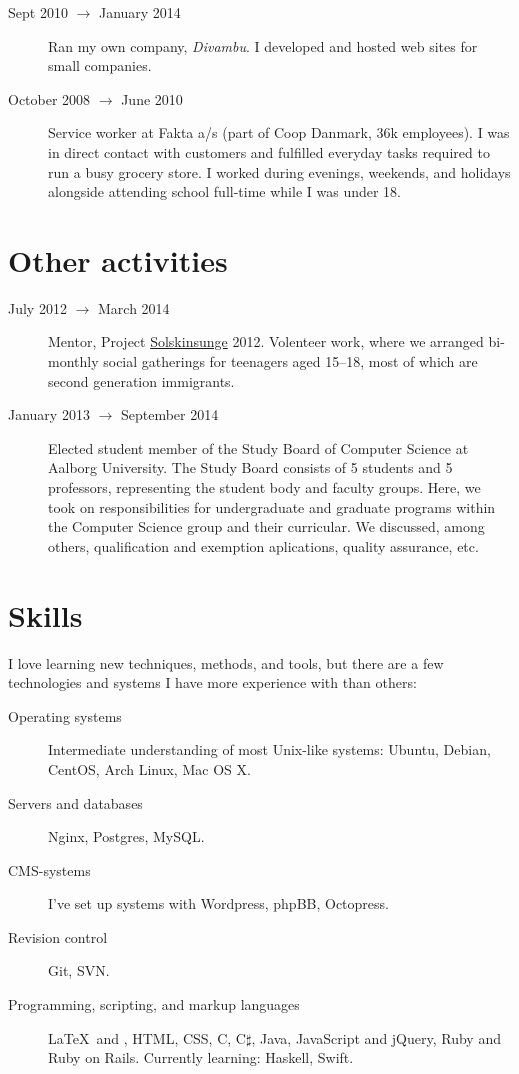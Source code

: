 \documentclass[margin,line]{resume}
\begin{document}
\begin{resume}
\begin{description}
  \item[Sept 2010 $\rightarrow$ January 2014] Ran my own company,
  \emph{Divambu}. I developed and hosted web sites for small companies.

  \item[October 2008 $\rightarrow$ June 2010] Service worker at Fakta
  a/s (part of Coop Danmark, 36k employees). I was in direct contact
  with customers and fulfilled everyday tasks required to run a busy
  grocery store. I worked during evenings, weekends, and holidays
  alongside attending school full-time while I was under 18.
\end{description}

\section{\mysidestyle{} Other activities}\vspace{1mm}
\begin{description}
  \item[July 2012 $\rightarrow$ March 2014] Mentor, Project
    \href{http://www.urk.dk/solskinsunge/}{Solskinsunge} 2012. Volenteer
    work, where we arranged bi-monthly social gatherings for teenagers aged
    15--18, most of which are second generation immigrants.

  \item[January 2013 $\rightarrow$ September 2014] Elected student member of the
  Study Board of Computer Science at Aalborg University. The Study Board
  consists of 5 students and 5 professors, representing the student body
  and faculty groups. Here, we took on responsibilities
  for undergraduate and graduate programs within the Computer Science
  group and their curricular. We discussed, among others, qualification
  and exemption aplications, quality assurance, etc.
\end{description}

\section{\mysidestyle{} Skills} \vspace{1mm}
I love learning new techniques, methods, and tools, but there are a few technologies and systems I have more experience with than others:
\vspace{0.5cm}
\begin{description}
  \item[Operating systems] Intermediate understanding of most Unix-like systems: Ubuntu, Debian, CentOS, Arch Linux, Mac OS X.
  \item[Servers and databases] Nginx, Postgres, MySQL\@.
  \item[CMS-systems] I've set up systems with Wordpress, phpBB, Octopress.
  \item[Revision control] Git, SVN\@.
  \item[Programming, scripting, and markup languages] \LaTeX\ and \XeTeX, HTML, CSS, C, C$\sharp$, Java, JavaScript and jQuery, Ruby and Ruby on Rails. Currently learning: Haskell, Swift.
\end{description}


\end{resume}
\end{document}
